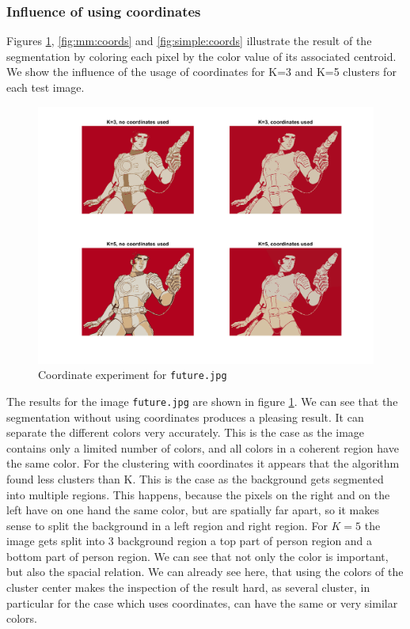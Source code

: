 \subsubsection{Influence of using coordinates}

Figures \ref{fig:future:coords}, \ref{fig:mm:coords} and \ref{fig:simple:coords} illustrate the result of the segmentation by coloring each pixel by the color value of its associated centroid. We show the influence of the usage of coordinates for K=3 and K=5 clusters for each test image.

\begin{figure}[h!]
\centering
\includegraphics[width = 0.95\linewidth]{figures/task2/future_coordinates.png}
\caption{Coordinate experiment for \texttt{future.jpg}}
\label{fig:future:coords}
\end{figure}

The results for the image \texttt{future.jpg} are shown in figure \ref{fig:future:coords}. We can see that the segmentation without using coordinates produces a pleasing result. It can separate the different colors very accurately. This is the case as the image contains only a limited number of colors, and all colors in a coherent region have the same color. For the clustering with coordinates it appears that the algorithm found less clusters than K. This is the case as the background gets segmented into multiple regions. This happens, because the pixels on the right and on the left have on one hand the same color, but are spatially far apart, so it makes sense to split the background in a left region and right region. For $K=5$ the image gets split into 3 background region a top part of person region and a bottom part of person region. We can see that not only the color is important, but also the spacial relation. We can already see here, that using the colors of the cluster center makes the inspection of the result hard, as several cluster, in particular for the case which uses coordinates, can have the same or very similar colors.

